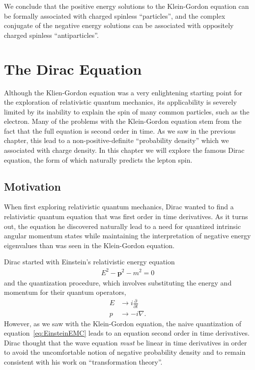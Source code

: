 \documentclass[titlepage,letterpaper,onecolumn,11pt,final]{report}
\numberwithin{equation}{section}
\numberwithin{figure}{section}
\begin{document}
We conclude that the positive energy solutions to the Klein-Gordon equation can be formally associated with charged spinless ``particles'', and the complex conjugate of the negative energy solutions can be associated with oppositely charged spinless ``antiparticles''.

\chapter{The Dirac Equation}

Although the Klien-Gordon equation was a very enlightening starting point for the exploration of relativistic quantum mechanics, its applicability is severely limited by its inability to explain the spin of many common particles, such as the electron. Many of the problems with the Klein-Gordon equation stem from the fact that the full equation is second order in time. As we saw in the previous chapter, this lead to a non-positive-definite ``probability density'' which we associated with charge density. In this chapter we will explore the famous Dirac equation, the form of which naturally predicts the lepton spin.

\section{Motivation}

When first exploring relativistic quantum mechanics, Dirac wanted to find a relativistic quantum equation that was first order in time derivatives. As it turns out, the equation he discovered naturally lead to a need for quantized intrinsic angular momentum states while maintaining the interpretation of negative energy eigenvalues than was seen in the Klein-Gordon equation.

Dirac started with Einstein's relativistic energy equation 
\begin{gather}
	\label{eq:EinsteinEMC}
	E^{2} - \mathbf{p}^{2} - m^{2}= 0 
\end{gather}
%
and the quantization procedure, which involves substituting the energy and momentum for their quantum operators,
\begin{subequations}
\label{eq:quantization_substitution}
\begin{align}
	E & \rightarrow i \frac{\partial}{\partial t} \\
	p & \rightarrow - i \nabla .
\end{align}
\end{subequations}
%
However, as we saw with the Klein-Gordon equation, the naive quantization of equation~\ref{eq:EinsteinEMC} leads to an equation second order in time derivatives. Dirac thought that the wave equation \emph{must} be linear in time derivatives in order to avoid the uncomfortable notion of negative probability density and to remain consistent with his work on ``transformation theory''.
\end{document}
